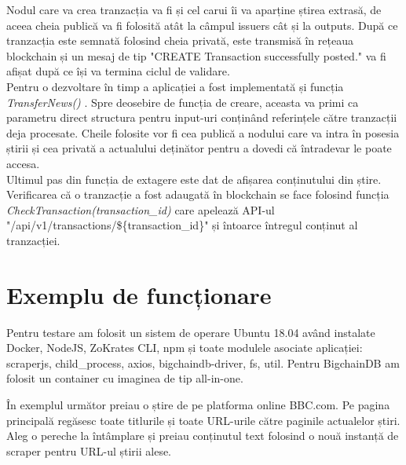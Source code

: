 Nodul care va crea tranzacția va fi și cel carui îi va aparține știrea extrasă, de aceea cheia publică va fi folosită atât la câmpul issuers cât și la outputs. După ce tranzacția este semnată folosind cheia privată, este transmisă în rețeaua blockchain și un mesaj de tip "CREATE Transaction successfully posted." va fi afișat după ce își va termina ciclul de validare.\\

Pentru o dezvoltare în timp a aplicației a fost implementată și funcția \textit{TransferNews()} \cite{TrustNews_TransferNews}. Spre deosebire de funcția de creare, aceasta va primi ca parametru direct structura pentru input-uri conținând referințele către tranzacții deja procesate. Cheile folosite vor fi cea publică a nodului care va intra în posesia știrii și cea privată a actualului deținător pentru a dovedi că întradevar le poate accesa.\\

Ultimul pas din funcția de extagere este dat de afișarea conținutului din știre. Verificarea că o tranzacție a fost adaugată în blockchain se face folosind funcția \textit{CheckTransaction(transaction\_id)} \cite{TrustNews_CheckTransaction} care apelează API-ul "/api/v1/transactions/\$\{transaction\_id\}" și întoarce întregul conținut al tranzacției.\\

\clearpage

\section{Exemplu de funcționare}

Pentru testare am folosit un sistem de operare Ubuntu 18.04 având instalate Docker, NodeJS, ZoKrates CLI, npm și toate modulele asociate aplicației: scraperjs, child\_process, axios, bigchaindb-driver, fs, util. Pentru BigchainDB am folosit un container cu imaginea de tip all-in-one.

În exemplul următor preiau o știre de pe platforma online BBC.com. Pe pagina principală regăsesc toate titlurile și toate URL-urile către paginile actualelor știri. Aleg o pereche la întâmplare și preiau conținutul text folosind o nouă instanță de scraper pentru URL-ul știrii alese.

